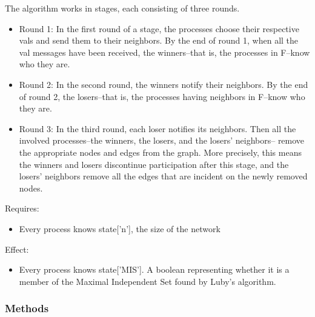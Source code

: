 The algorithm works in stages, each consisting of three rounds.

\begin{itemize}
\setlength{\parskip}{0.6ex}
  \item Round 1: In the first round of a stage, the processes choose their 
    respective vals and send them to their neighbors. By the end of round 
    1, when all the val messages have been received, the winners--that is, 
    the processes in F--know who they are.

  \item Round 2: In the second round, the winners notify their neighbors. By 
    the end of round 2, the losers--that is, the processes having neighbors
    in F--know who they are.

  \item Round 3: In the third round, each loser notifies its neighbors. Then 
    all the involved processes--the winners, the losers, and the losers' 
    neighbors-- remove the appropriate nodes and edges from the graph. More
    precisely, this means the winners and losers discontinue participation 
    after this stage, and the losers' neighbors remove all the edges that 
    are incident on the newly removed nodes.

\end{itemize}

Requires:

\begin{itemize}
\setlength{\parskip}{0.6ex}
  \item Every process knows state['n'], the size of the network

\end{itemize}

Effect:

\begin{itemize}
\setlength{\parskip}{0.6ex}
  \item Every process knows state['MIS']. A boolean representing whether it is 
    a member of the Maximal Independent Set found by Luby's algorithm.

\end{itemize}



  \subsubsection{Methods}

